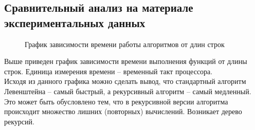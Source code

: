 \newpage
\subsection{Сравнительный анализ на материале экспериментальных данных}

\begin{figure}[h]
\caption{График зависимости времени работы алгоритмов от длин строк}
\label{images:graphics}
\end{figure}

Выше приведен график зависимости времени выполнения функций от длины строк. Единица измерения времени – временный такт процессора. \\

Исходя из данного графика можно сделать вывод, что стандартный алгоритм Левенштейна – самый быстрый, а рекурсивный алгоритм – самый медленный. Это может быть обусловлено тем, что в рекурсивной версии алгоритма происходит множество лишних (повторных) вычислений. Возникает дерево рекурсий. \\

\newpage
